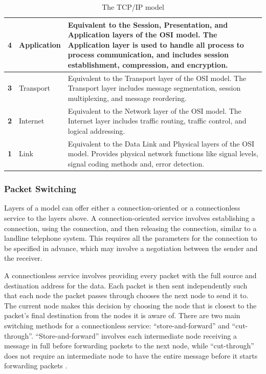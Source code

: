 \documentclass[12pt, a4paper, twoside, onecolumn]{article}
\begin{document}
\begin{table}[!ht]
  \begin{center}
    \begin{tabularx}{\textwidth}{|c|l|X|}
      \hline
      \textbf{4} & Application & Equivalent to the Session, Presentation, and Application layers of the OSI model. The Application layer is used to handle all process to process communication, and includes session establishment, compression, and encryption. \\ \hline
      \textbf{3} & Transport & Equivalent to the Transport layer of the OSI model. The Transport layer includes message segmentation, session multiplexing, and message reordering. \\ \hline
      \textbf{2} & Internet & Equivalent to the Network layer of the OSI model. The Internet layer includes traffic routing, traffic control, and logical addressing. \\ \hline
      \textbf{1} & Link & Equivalent to the Data Link and Physical layers of the OSI model. Provides physical network functions like signal levels, signal coding methods and, error detection. \\ \hline
    \end{tabularx}
  \end{center}
  \caption{The TCP/IP model \cite{tcpip_pearson}}
  \label{tcp_ip_model}
\end{table}

\subsubsection{Packet Switching}
Layers of a model can offer either a connection-oriented or a connectionless service to the layers above. A connection-oriented service involves establishing a connection, using the connection, and then releasing the connection, similar to a landline telephone system. This requires all the parameters for the connection to be specified in advance, which may involve a negotiation between the sender and the receiver.

A connectionless service involves providing every packet with the full source and destination address for the data. Each packet is then sent independently such that each node the packet passes through chooses the next node to send it to. The current node makes this decision by choosing the node that is closest to the packet's final destination from the nodes it is aware of. There are two main switching methods for a connectionless service: ``store-and-forward'' and ``cut-through''. ``Store-and-forward'' involves each intermediate node receiving a message in full before forwarding packets to the next node, while ``cut-through'' does not require an intermediate node to have the entire message before it starts forwarding packets \cite{tanenbaum}.
\end{document}
